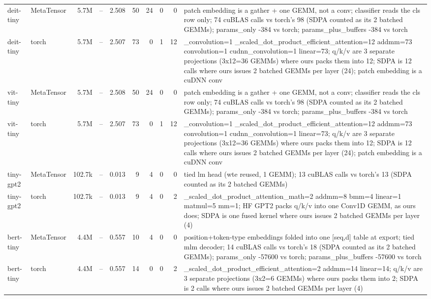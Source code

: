\begin{tabular}{llrrrrrrrp{}}
deit-tiny & MetaTensor & 5.7M & -- & 2.508 & 50 & 24 & 0 & 0 & patch embedding is a gather + one GEMM, not a conv; classifier reads the cls row only; 74 cuBLAS calls vs torch's 98 (SDPA counted as its 2 batched GEMMs); params\_only -384 vs torch; params\_plus\_buffers -384 vs torch \\
deit-tiny & torch & 5.7M & -- & 2.507 & 73 & 0 & 1 & 12 & \_convolution=1 \_scaled\_dot\_product\_efficient\_attention=12 addmm=73 convolution=1 cudnn\_convolution=1 linear=73; q/k/v are 3 separate projections (3x12=36 GEMMs) where ours packs them into 12; SDPA is 12 calls where ours issues 2 batched GEMMs per layer (24); patch embedding is a cuDNN conv \\
vit-tiny & MetaTensor & 5.7M & -- & 2.508 & 50 & 24 & 0 & 0 & patch embedding is a gather + one GEMM, not a conv; classifier reads the cls row only; 74 cuBLAS calls vs torch's 98 (SDPA counted as its 2 batched GEMMs); params\_only -384 vs torch; params\_plus\_buffers -384 vs torch \\
vit-tiny & torch & 5.7M & -- & 2.507 & 73 & 0 & 1 & 12 & \_convolution=1 \_scaled\_dot\_product\_efficient\_attention=12 addmm=73 convolution=1 cudnn\_convolution=1 linear=73; q/k/v are 3 separate projections (3x12=36 GEMMs) where ours packs them into 12; SDPA is 12 calls where ours issues 2 batched GEMMs per layer (24); patch embedding is a cuDNN conv \\
tiny-gpt2 & MetaTensor & 102.7k & -- & 0.013 & 9 & 4 & 0 & 0 & tied lm head (wte reused, 1 GEMM); 13 cuBLAS calls vs torch's 13 (SDPA counted as its 2 batched GEMMs) \\
tiny-gpt2 & torch & 102.7k & -- & 0.013 & 9 & 4 & 0 & 2 & \_scaled\_dot\_product\_attention\_math=2 addmm=8 bmm=4 linear=1 matmul=5 mm=1; HF GPT2 packs q/k/v into one Conv1D GEMM, as ours does; SDPA is one fused kernel where ours issues 2 batched GEMMs per layer (4) \\
bert-tiny & MetaTensor & 4.4M & -- & 0.557 & 10 & 4 & 0 & 0 & position+token-type embeddings folded into one [seq,d] table at export; tied mlm decoder; 14 cuBLAS calls vs torch's 18 (SDPA counted as its 2 batched GEMMs); params\_only -57600 vs torch; params\_plus\_buffers -57600 vs torch \\
bert-tiny & torch & 4.4M & -- & 0.557 & 14 & 0 & 0 & 2 & \_scaled\_dot\_product\_efficient\_attention=2 addmm=14 linear=14; q/k/v are 3 separate projections (3x2=6 GEMMs) where ours packs them into 2; SDPA is 2 calls where ours issues 2 batched GEMMs per layer (4) \\
\bottomrule
\end{tabular}


